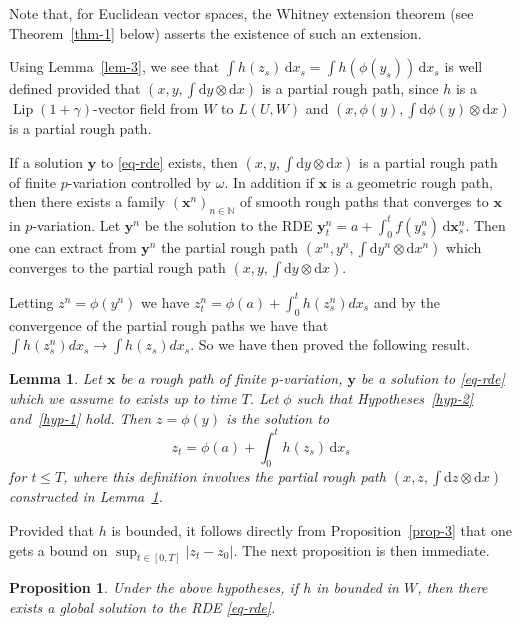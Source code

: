 \documentclass[a4paper,12pt]{article}
\newtheorem{lemma}[theorem]{Lemma}
\newtheorem{proposition}[theorem]{Proposition}
\theoremstyle{definition}
\newcommand{\vd}{\,\mathrm{d}}
\newcommand{\dd}{\mathrm{d}}
\newcommand{\bx}{\mathbf{x}}
\newcommand{\by}{\mathbf{y}}
\newcommand{\NN}{\mathbb{N}}
\DeclareMathOperator{\Lip}{Lip}
\begin{document}
Note that, for Euclidean vector spaces, the Whitney extension 
theorem (see Theorem~\ref{thm-1} below) asserts the existence of such an extension.


Using Lemma~\ref{lem-3}, we see that 
$\int h(z_s)\vd x_s=\int h(\phi(y_s))\vd x_s$
is well defined provided that $\left(x,y,\int \dd y \otimes\dd x\right)$
is a partial rough path, since $h$ is a $\Lip(1+\gamma)$-vector field from $W$ to $L(U,W)$
and $\left(x,\phi(y),\int \dd \phi(y)\otimes\dd x\right)$ is a partial rough path.

If a solution $\by$ to \eqref{eq-rde} exists,
then 
$\left(x,y,\int \dd y\otimes\dd x\right)$ is a 
partial rough path of finite $p$-variation controlled
by $\omega$. In addition if $\bx$ is a geometric rough 
path, then there exists a family $(\bx^n)_{n\in\NN}$
of smooth rough paths that converges to $\bx$ in $p$-variation.
Let $\by^n$ be the solution to the RDE
$\by^n_t=a+\int_0^t f(y^n_s)\vd\bx^n_s$. 
Then one can extract from $\by^n$ the partial 
rough path $\left(x^n,y^n,\int \dd y^n\otimes\dd x^n\right)$
which converges to the partial rough path 
$\left(x,y,\int \dd y\otimes\dd x\right)$.

Letting $z^n=\phi(y^n)$ we have
$z^n_t = \phi(a)+\int_0^t h(z^n_s) dx_s$ and by the convergence of the partial rough paths we have that 
$
\int h(z^n_s) dx_s \to \int h(z_s) dx_s
$.
So we have then proved the following result.

\begin{lemma}
\label{lem-4}
Let $\bx$ be a rough path of finite $p$-variation, 
$\by$ be a solution to \eqref{eq-rde} which we assume to exists up
to time $T$. Let $\phi$ such that Hypotheses~\ref{hyp-2} and~\ref{hyp-1} hold.
Then $z=\phi(y)$ is the solution to 
\begin{equation}
\label{eq-27}
z_t=\phi(a)+\int_0^t h(z_s)\vd x_s
\end{equation}
for $t\leq T$,
where this definition involves the partial rough path
$\left(x,z,\int \dd z\otimes\dd x\right)$ constructed
in Lemma~\ref{lem-4}.
\end{lemma}

Provided that $h$ is bounded, it follows directly from Proposition~\ref{prop-3} 
that one gets a bound on $\sup_{t\in[0,T]}|z_t-z_0|$.
The next proposition is then immediate.

\begin{proposition}
\label{prop-1}
Under the above hypotheses, if $h$ in bounded in $W$, 
then there exists a global solution to the RDE \eqref{eq-rde}.
\end{proposition}
\end{document}
